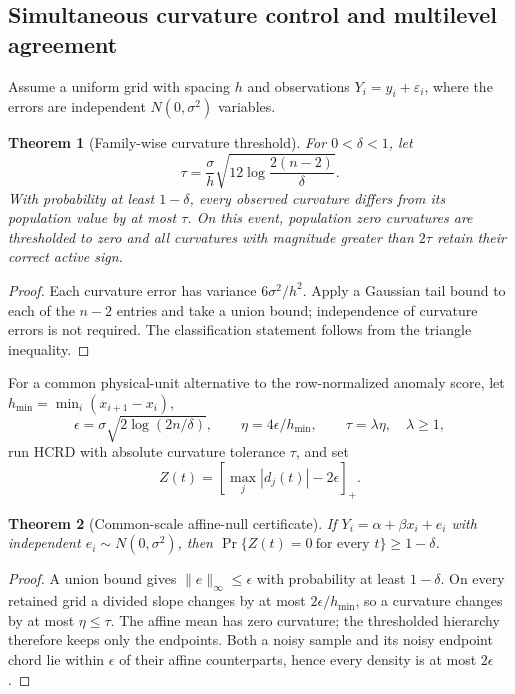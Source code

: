\documentclass[review,onefignum,onetabnum]{siamonline250211}
\newtheorem{theorem}{Theorem}
\begin{document}
\subsection{Simultaneous curvature control and multilevel agreement}
Assume a uniform grid with spacing $h$ and observations
$Y_i=y_i+\varepsilon_i$, where the errors are independent
$N(0,\sigma^2)$ variables.

\begin{theorem}[Family-wise curvature threshold]
\label{thm:noise}
For $0<\delta<1$, let
\begin{equation}
\tau=\frac{\sigma}{h}\sqrt{12\log\frac{2(n-2)}{\delta}}.
\end{equation}
With probability at least $1-\delta$, every observed curvature differs from its
population value by at most $\tau$.  On this event, population zero curvatures
are thresholded to zero and all curvatures with magnitude greater than
$2\tau$ retain their correct active sign.
\end{theorem}
\begin{proof}
Each curvature error has variance $6\sigma^2/h^2$.  Apply a Gaussian tail bound
to each of the $n-2$ entries and take a union bound; independence of curvature
errors is not required.  The classification statement follows from the triangle
inequality.
\end{proof}

For a common physical-unit alternative to the row-normalized anomaly score,
let $h_{\min}=\min_i(x_{i+1}-x_i)$,
\begin{equation}
 \epsilon=\sigma\sqrt{2\log(2n/\delta)},\qquad
 \eta=4\epsilon/h_{\min},\qquad \tau=\lambda\eta,\quad\lambda\ge1,
\end{equation}
run HCRD with absolute curvature tolerance $\tau$, and set
\begin{equation}
 Z(t)=\left[\max_j |d_j(t)|-2\epsilon\right]_+.
\end{equation}

\ifdefined\SPsubmission
\else
\begin{theorem}[Common-scale affine-null certificate]
\label{thm:affine-null}
If $Y_i=\alpha+\beta x_i+e_i$ with independent
$e_i\sim N(0,\sigma^2)$, then
$\Pr\{Z(t)=0\ \text{for every }t\}\ge1-\delta$.
\end{theorem}
\begin{proof}
A union bound gives $\|e\|_\infty\le\epsilon$ with probability at least
$1-\delta$.  On every retained grid a divided slope changes by at most
$2\epsilon/h_{\min}$, so a curvature changes by at most $\eta\le\tau$.
The affine mean has zero curvature; the thresholded hierarchy therefore keeps
only the endpoints.  Both a noisy sample and its noisy endpoint chord lie
within $\epsilon$ of their affine counterparts, hence every density is at most
$2\epsilon$.
\end{proof}
\fi
\end{document}
